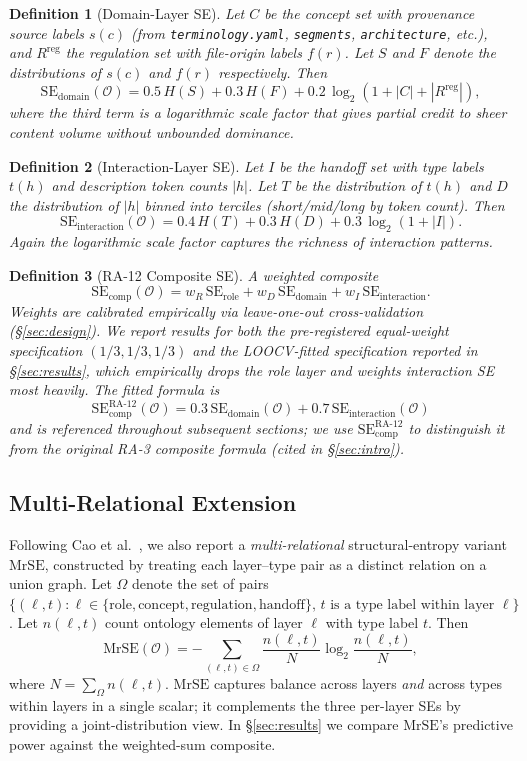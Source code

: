 \documentclass[11pt,a4paper]{article}
\newtheorem{definition}{Definition}
\newcommand{\se}{\mathrm{SE}}
\newcommand{\serole}{\se_{\text{role}}}
\newcommand{\sedom}{\se_{\text{domain}}}
\newcommand{\seint}{\se_{\text{interaction}}}
\newcommand{\secomp}{\se_{\text{comp}}}
\newcommand{\mrse}{\mathrm{MrSE}}
\newcommand{\onto}{\mathcal{O}}
\begin{document}
\begin{definition}[Domain-Layer SE]
\label{def:domain-se}
Let $C$ be the concept set with provenance source labels $s(c)$ (from
\texttt{terminology.yaml}, \texttt{segments}, \texttt{architecture},
etc.), and $R^{\mathrm{reg}}$ the regulation set with file-origin labels
$f(r)$. Let $S$ and $F$ denote the distributions of $s(c)$ and $f(r)$
respectively. Then
$$\sedom(\onto) = 0.5\,H(S) + 0.3\,H(F) + 0.2\,\log_2(1 + |C| + |R^{\mathrm{reg}}|),$$
where the third term is a logarithmic scale factor that gives partial
credit to sheer content volume without unbounded dominance.
\end{definition}

\begin{definition}[Interaction-Layer SE]
\label{def:interaction-se}
Let $I$ be the handoff set with type labels $t(h)$ and description
token counts $|h|$. Let $T$ be the distribution of $t(h)$ and $D$ the
distribution of $|h|$ binned into terciles (short/mid/long by token
count). Then
$$\seint(\onto) = 0.4\,H(T) + 0.3\,H(D) + 0.3\,\log_2(1 + |I|).$$
Again the logarithmic scale factor captures the richness of
interaction patterns.
\end{definition}

\begin{definition}[RA-12 Composite SE]
\label{def:composite-se}
A weighted composite
$$\secomp(\onto) = w_R\,\serole + w_D\,\sedom + w_I\,\seint.$$
Weights are calibrated empirically via leave-one-out cross-validation
(\S\ref{sec:design}). We report results for both the pre-registered
equal-weight specification $(1/3, 1/3, 1/3)$ and the LOOCV-fitted
specification reported in \S\ref{sec:results}, which empirically
drops the role layer and weights interaction SE most heavily. The
fitted formula is
$$\secomp^{\text{RA-12}}(\onto) = 0.3\,\sedom(\onto) + 0.7\,\seint(\onto)$$
and is referenced throughout subsequent sections; we use
$\secomp^{\text{RA-12}}$ to distinguish it from the original RA-3
composite formula (cited in \S\ref{sec:intro}).
\end{definition}

\subsection{Multi-Relational Extension}

Following Cao et al.\ \citep{cao2024mrse}, we also report a
\emph{multi-relational} structural-entropy variant $\mrse$, constructed
by treating each layer--type pair as a distinct relation on a union
graph. Let $\Omega$ denote the set of pairs
$\{(\ell, t) : \ell \in \{\mathrm{role, concept, regulation, handoff}\},\,
t \text{ is a type label within layer } \ell\}$. Let $n(\ell, t)$ count
ontology elements of layer $\ell$ with type label $t$. Then
$$\mrse(\onto) = -\sum_{(\ell, t) \in \Omega} \frac{n(\ell, t)}{N}
\log_2 \frac{n(\ell, t)}{N},$$
where $N = \sum_\Omega n(\ell, t)$. $\mrse$ captures balance across
layers \emph{and} across types within layers in a single scalar; it
complements the three per-layer SEs by providing a joint-distribution
view. In \S\ref{sec:results} we compare $\mrse$'s predictive power
against the weighted-sum composite.
\end{document}
